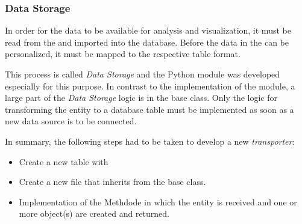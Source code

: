 \subsubsection{Data Storage}
\label{subsubsec:storage}
In order for the data to be available for analysis and visualization, it must be read from the \gds{} and imported into the \pg{} database.
Before the data in the \pg{} can be personalized, it must be mapped to the respective table format.

This process is called \textit{Data Storage} and the Python module  was developed especially for this purpose.
In contrast to the implementation of the  module, a large part of the \textit{Data Storage} logic is in the base class.
Only the logic for transforming the \gds{} entity to a \pg{} database table must be implemented as soon as a new
data source is to be connected.

In summary, the following steps had to be taken to develop a new \textit{transporter}:
\begin{itemize}
  \item Create a new \pg{} table with 
  \item Create a new  file that inherits from the base class.
  \item Implementation of the  Methdode in which the \gds{} entity is received and one or more  object(s) are created and returned.
\end{itemize}
